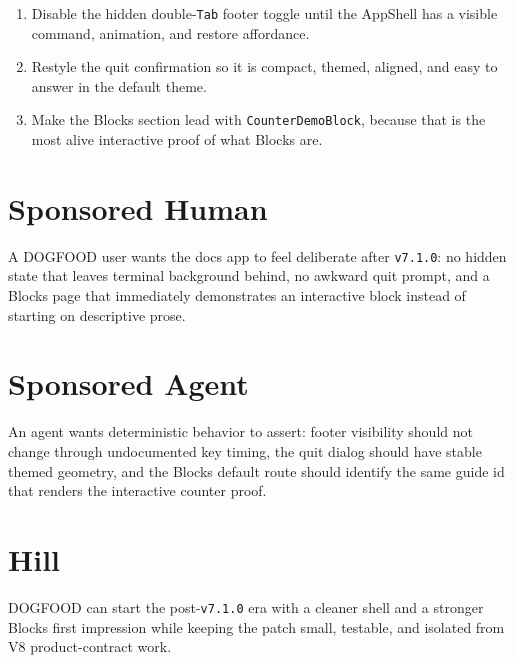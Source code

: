 \begin{enumerate}
\def\labelenumi{\arabic{enumi}.}
\tightlist
\item
  Disable the hidden double-\texttt{T\allowbreak{}a\allowbreak{}b} footer toggle until the AppShell has a visible command, animation, and restore affordance.
\item
  Restyle the quit confirmation so it is compact, themed, aligned, and easy to answer in the default theme.
\item
  Make the Blocks section lead with \texttt{C\allowbreak{}o\allowbreak{}u\allowbreak{}n\allowbreak{}t\allowbreak{}e\allowbreak{}r\allowbreak{}D\allowbreak{}e\allowbreak{}m\allowbreak{}o\allowbreak{}B\allowbreak{}l\allowbreak{}o\allowbreak{}c\allowbreak{}k}, because that is the most alive interactive proof of what Blocks are.
\end{enumerate}

\section{Sponsored Human}\label{record-115-sponsored-human}

A DOGFOOD user wants the docs app to feel deliberate after \texttt{v\allowbreak{}7\allowbreak{}.\allowbreak{}1\allowbreak{}.\allowbreak{}0}: no hidden state that leaves terminal background behind, no awkward quit prompt, and a Blocks page that immediately demonstrates an interactive block instead of starting on descriptive prose.

\section{Sponsored Agent}\label{record-115-sponsored-agent}

An agent wants deterministic behavior to assert: footer visibility should not change through undocumented key timing, the quit dialog should have stable themed geometry, and the Blocks default route should identify the same guide id that renders the interactive counter proof.

\section{Hill}\label{record-115-hill}

DOGFOOD can start the post-\texttt{v\allowbreak{}7\allowbreak{}.\allowbreak{}1\allowbreak{}.\allowbreak{}0} era with a cleaner shell and a stronger Blocks first impression while keeping the patch small, testable, and isolated from V8 product-contract work.

